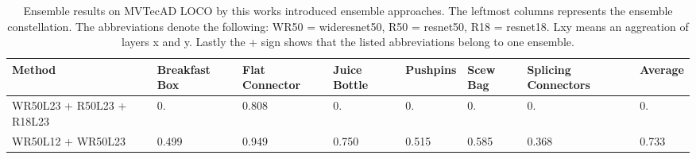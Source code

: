 \begin{table}[htbp]
    \tiny
    \centering
    \begin{tabularx}{\textwidth}{|X|X|X|X|X|X|X|X|}%
        \hline
        \textbf{Method} & \textbf{Breakfast Box} & \textbf{Flat Connector} & \textbf{Juice Bottle} & \textbf{Pushpins} & \textbf{Scew Bag} & \textbf{Splicing Connectors} & \textbf{Average} \\
        \hline
        WR50L23 + R50L23 + R18L23  & 0. & 0.808 & 0. & 0. & 0. & 0. & 0. \\
        \hline
        WR50L12 + WR50L23 & 0.499 & 0.949 & 0.750 & 0.515 & 0.585 & 0.368 & 0.733 \\
        \hline
    \end{tabularx}
    \caption{Ensemble results on MVTecAD LOCO \cite{LOCODentsAndScratchesBergmann2022} by this works introduced ensemble approaches. The leftmost columns represents the ensemble 
             constellation. The abbreviations denote the following: 
             WR50 = wideresnet50, R50 = resnet50, R18 = resnet18. Lxy means an aggreation of layers x and y. Lastly the + sign shows that the listed abbreviations belong to one ensemble.}
    \label{tab:ensemblepixelAUROC}
\end{table}



